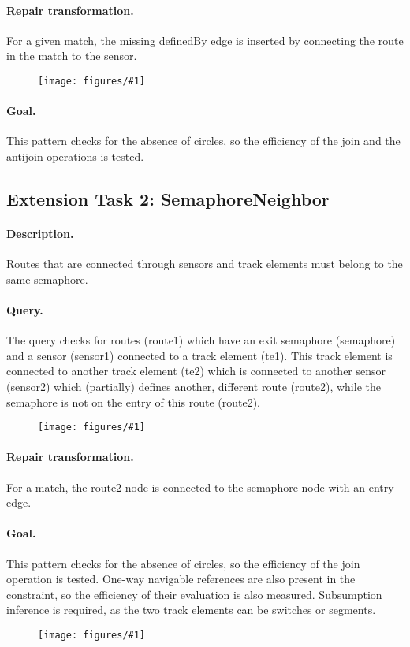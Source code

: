 \documentclass[submission,copyright,creativecommons]{eptcs}
\newcommand{\ttcpattern}[1]{
\begin{figure}[H] 
	\centering
	\texttt{[image: figures/\#1]}
\end{figure}}
\begin{document}
\paragraph{Repair transformation.} For a given match, the missing \textsf{definedBy} edge is inserted by connecting the \textsf{route} in the match to the \textsf{sensor}.
\ttcpattern{transformation-routesensor}
\paragraph{Goal.} This pattern checks for the absence of circles, so the efficiency of the join and the antijoin operations is tested.


\subsection{Extension Task 2: SemaphoreNeighbor}
\label{semaphoreneighbor}
\paragraph{Description.} Routes that are connected through sensors and track elements must belong to the same semaphore.
\paragraph{Query.} The query checks for routes (\textsf{route1}) which have an exit semaphore (\textsf{semaphore}) and a sensor (\textsf{sensor1}) connected to a track element (\textsf{te1}). This track element is connected to another track element (\textsf{te2}) which is connected to another sensor (\textsf{sensor2}) which (partially) defines another, different route (\textsf{route2}), while the semaphore is not on the entry of this route (\textsf{route2}).
\ttcpattern{pattern-semaphoreneighbor}
\paragraph{Repair transformation.} For a match, the \textsf{route2} node is connected to the \textsf{semaphore} node with an \textsf{entry} edge.
\paragraph{Goal.} This pattern checks for the absence of circles, so the efficiency of the join operation is tested. One-way navigable references are also present in the constraint, so the efficiency of their evaluation is also measured. Subsumption inference is required, as the two track elements can be switches or segments.
\ttcpattern{transformation-semaphoreneighbor}
\end{document}
